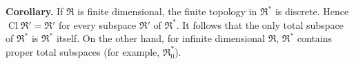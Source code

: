 \textbf{Corollary.} If $\mathfrak{R}$ is finite dimensional, the finite topology in $\mathfrak{R}^*$ is discrete. Hence $\operatorname{Cl} \mathfrak{R}' = \mathfrak{R}'$ for every subspace $\mathfrak{R}'$ of $\mathfrak{R}^*$. It follows that the only total subspace of $\mathfrak{R}^*$ is $\mathfrak{R}^*$ itself. On the other hand, for infinite dimensional $\mathfrak{R}$, $\mathfrak{R}^*$ contains proper total subspaces (for example, $\mathfrak{R}_0^*$).
